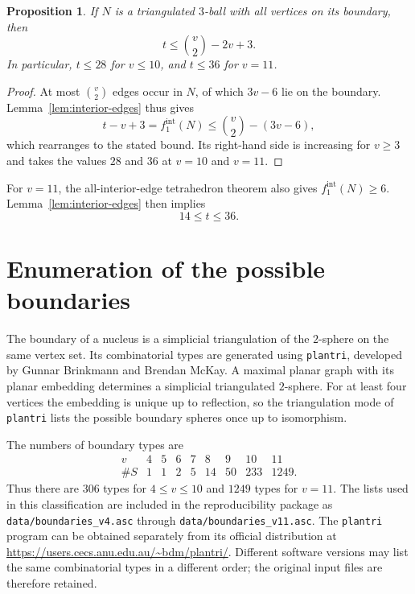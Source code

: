 \documentclass[11pt]{article}
\newtheorem{proposition}[theorem]{Proposition}
\begin{document}
\begin{proposition}\label{prop:tbound}
If $N$ is a triangulated $3$-ball with all vertices on its boundary, then
\[
 \boxed{\ t\le\binom v2-2v+3.\ }
\]
In particular, $t\le28$ for $v\le10$, and $t\le36$ for $v=11$.
\end{proposition}

\begin{proof}
At most $\binom v2$ edges occur in $N$, of which $3v-6$ lie on
the boundary.  Lemma~\ref{lem:interior-edges} thus gives
\[
 t-v+3=f_1^{\mathrm{int}}(N)
 \le\binom v2-(3v-6),
\]
which rearranges to the stated bound.  Its right-hand side is increasing
for $v\ge3$ and takes the values $28$ and $36$ at $v=10$ and $v=11$.
\end{proof}

For $v=11$, the all-interior-edge tetrahedron theorem also gives
$f_1^{\mathrm{int}}(N)\ge6$.  Lemma~\ref{lem:interior-edges} then implies
\begin{equation}\label{eq:t-range}
 14\le t\le36.
\end{equation}

\section{Enumeration of the possible boundaries}

The boundary of a nucleus is a simplicial triangulation of the $2$-sphere
on the same vertex set.  Its combinatorial types are generated using
\texttt{plantri}, developed by Gunnar Brinkmann and Brendan McKay.
A maximal planar graph with its planar embedding determines a simplicial
triangulated $2$-sphere.  For at least four vertices the embedding is unique
up to reflection, so the triangulation mode of \texttt{plantri} lists the
possible boundary spheres once up to isomorphism.

The numbers of boundary types are
\[
\begin{array}{c|rrrrrrrr}
 v&4&5&6&7&8&9&10&11\\ \hline
 \#S&1&1&2&5&14&50&233&1249.
\end{array}
\]
Thus there are $306$ types for $4\le v\le10$ and $1249$ types for $v=11$.
The lists used in this classification are included in the reproducibility
package as \texttt{data/boundaries\_v4.asc} through
\texttt{data/boundaries\_v11.asc}. The \texttt{plantri} program can be
obtained separately from its official distribution at
\url{https://users.cecs.anu.edu.au/~bdm/plantri/}.
Different software versions may list the same combinatorial types in a
different order; the original input files are therefore retained.
\end{document}

